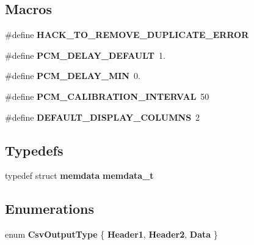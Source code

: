 \subsection*{Macros}
\begin{DoxyCompactItemize}
\item 
\mbox{\label{pcm-memory_8cpp_ac4eeb11d89b0f517835a12a04443ebe4}} 
\#define {\bfseries H\+A\+C\+K\+\_\+\+T\+O\+\_\+\+R\+E\+M\+O\+V\+E\+\_\+\+D\+U\+P\+L\+I\+C\+A\+T\+E\+\_\+\+E\+R\+R\+OR}
\item 
\mbox{\label{pcm-memory_8cpp_aa9ecc55c90c7a69729babc4f5f91ed96}} 
\#define {\bfseries P\+C\+M\+\_\+\+D\+E\+L\+A\+Y\+\_\+\+D\+E\+F\+A\+U\+LT}~1.
\item 
\mbox{\label{pcm-memory_8cpp_acccbe8441d6dd75bdc949f5f0ee126c5}} 
\#define {\bfseries P\+C\+M\+\_\+\+D\+E\+L\+A\+Y\+\_\+\+M\+IN}~0.
\item 
\mbox{\label{pcm-memory_8cpp_a433dde946b6713059756318598c9a6fe}} 
\#define {\bfseries P\+C\+M\+\_\+\+C\+A\+L\+I\+B\+R\+A\+T\+I\+O\+N\+\_\+\+I\+N\+T\+E\+R\+V\+AL}~50
\item 
\mbox{\label{pcm-memory_8cpp_ab5189406a4fa5221316460ceead91292}} 
\#define {\bfseries D\+E\+F\+A\+U\+L\+T\+\_\+\+D\+I\+S\+P\+L\+A\+Y\+\_\+\+C\+O\+L\+U\+M\+NS}~2
\end{DoxyCompactItemize}
\subsection*{Typedefs}
\begin{DoxyCompactItemize}
\item 
\mbox{\label{pcm-memory_8cpp_a2bf815f628bb420ad49e0b50bd6ebd8d}} 
typedef struct \textbf{ memdata} {\bfseries memdata\+\_\+t}
\end{DoxyCompactItemize}
\subsection*{Enumerations}
\begin{DoxyCompactItemize}
\item 
\mbox{\label{pcm-memory_8cpp_afa2597d9b814fabdf0168d6fd0c52145}} 
enum {\bfseries Csv\+Output\+Type} \{ {\bfseries Header1}, 
{\bfseries Header2}, 
{\bfseries Data}
 \}
\end{DoxyCompactItemize}
